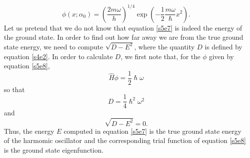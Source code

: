 \documentclass{article}
\numberwithin{equation}{section}
\begin{document}
\begin{equation}\label{s5e8}
\phi(x;\alpha_0) = \left(\frac{2m\omega}{h}\right)^{1/4}\exp
\left(-\frac{1}{2}\frac{m\omega}{\hslash}x^2\right).
\end{equation}
Let us pretend that we do not know that equation \eqref{s5e7} is indeed
the energy of the ground state. In order to find out how far away we are
from the true ground state energy, we need to compute $\sqrt{D - E^2}$,
where the quantity $D$ is defined by equation \eqref{s4e2}. In order to
calculate $D$, we first note that, for the $\phi$ given by equation
\eqref{s5e8},
\begin{equation}\label{s5e9}
\hat{H}\phi = \frac{1}{2}\hslash\omega
\end{equation}
so that
\begin{equation}\label{s5e10}
D = \frac{1}{4}\hslash^2\omega^2
\end{equation}
and
\begin{equation}\label{s5e11}
\sqrt{D - E^2} = 0.
\end{equation}
Thus, the energy $E$ computed in equation \eqref{s5e7} is the true ground
state energy of the harmomic oscillator and the corresponding trial function
of equation \eqref{s5e8} is the ground state eigenfunction.
\end{document}
